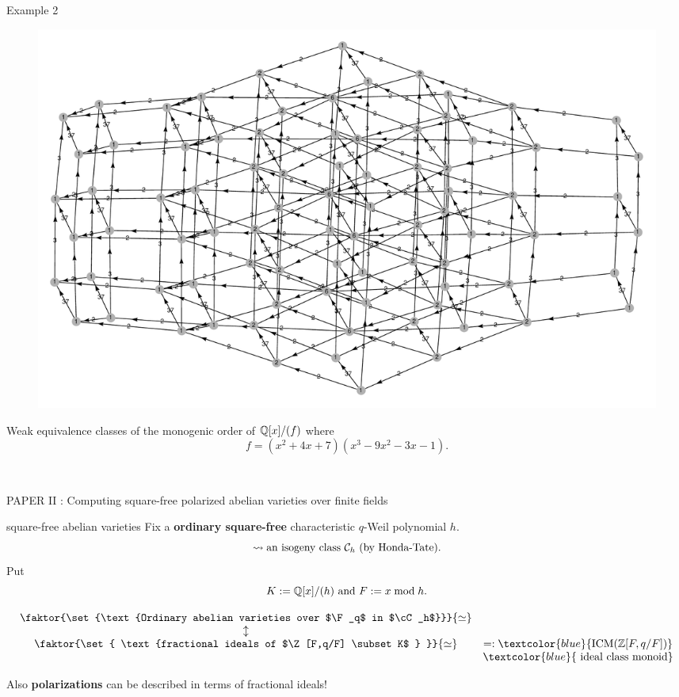 \documentclass{beamer}
\begin{document}
\begin{frame}{Example 2}
\vspace{-2 em}
\begin{figure}
    \includegraphics[width=1\textwidth]{graph-1}
\end{figure}
\vspace{-2 em} Weak equivalence classes of the monogenic order of $\mathbb{Q}[x]/(f)$ where
\[ f=(x^2+4x+7)(x^3−9x^2−3x−1). \] 
\end{frame}

\begin{frame}{\ }
\begin{center}
\Large
   PAPER II : Computing square-free polarized abelian varieties over finite fields
\end{center}
\end{frame}

\begin{frame}{square-free abelian varieties}
Fix a \textbf{ordinary square-free} characteristic $q$-Weil polynomial $h$.\\
\[\rightsquigarrow \text{an isogeny class ${\mathcal C}_h$ (by Honda-Tate)}.\]
Put 
\[K := \mathbb{Q}[x]/(h) \text{ and } F:= x \bmod h. \]
\pause
\begin{theorem}[M.]
\[\begin{array}{cc}
\faktor{\set{\text{Ordinary abelian varieties over $\F_q$ in $\cC_h$}}}{\simeq} & \\
\updownarrow & \\
\faktor{\set{ \text{fractional ideals of $\Z[F,q/F] \subset K$ } }}{\simeq} & =:\textcolor{blue}{\ICM(\Z[F,q/F])}\\ 
  & \textcolor{blue}{\text{ ideal class monoid} }
  \end{array}\]
\end{theorem}
\pause \vspace{-1.2 em} Also \textbf{polarizations} can be described in terms of fractional ideals!

\end{frame}
\end{document}

